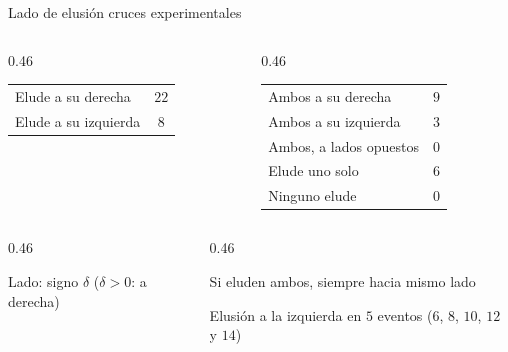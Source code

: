 \begin{frame}{Lado de elusión cruces experimentales}
  \centering
  \renewcommand{\arraystretch}{1.4}
  \begin{columns}[T]
    \begin{column}{0.46\textwidth}
      \par\smallskip
      \begin{tabular}{lc}
        \hline
        Elude a su derecha & $22$ \\
        Elude a su izquierda & $8$ \\
        \hline
      \end{tabular}
    \end{column}
    \begin{column}{0.46\textwidth}
      \par\smallskip
      \begin{tabular}{lc}
        \hline
        Ambos a su derecha & $9$ \\
        Ambos a su izquierda & $3$ \\
        Ambos, a lados opuestos & $0$ \\
        Elude uno solo & $6$ \\
        Ninguno elude & $0$ \\
        \hline
      \end{tabular}
    \end{column}
  \end{columns}

  \vspace{12pt}
  \begin{columns}[T]
    \begin{column}{0.46\textwidth}
      \begin{parametros}
        \item Lado: signo $\delta$ ($\delta > 0$: a derecha)
      \end{parametros}
    \end{column}
    \begin{column}{0.46\textwidth}
      \begin{resultado}
        \item Si eluden ambos, siempre hacia mismo lado
        \item Elusión a la izquierda en $5$ eventos ($6$, $8$, $10$, $12$ y $14$)
      \end{resultado}
    \end{column}
  \end{columns}
\end{frame}


